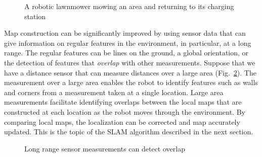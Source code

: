 \begin{figure}
\begin{center}
\end{center}
\caption{A robotic lawnmower mowing an area and returning to its charging station}\label{fig.lawn}
\end{figure}

Map construction can be significantly improved by using sensor data that can give information on regular features in the environment, in particular, at a long range. The regular features can be lines on the ground, a global orientation, or the detection of features that \emph{overlap} with other measurements. Suppose that we have a distance sensor that can measure distances over a large area (Fig.~\ref{fig.map_overlap}). The measurement over a large area enables the robot to identify features such as walls and corners from a measurement taken at a single location. Large area measurements facilitate identifying overlaps between the local maps that are constructed at each location as the robot moves through the environment. By comparing local maps, the localization can be corrected and map accurately updated. This is the topic of the SLAM algorithm described in the next section.

\begin{figure}
\begin{center}
\end{center}
\caption{Long range sensor measurements can detect overlap}\label{fig.map_overlap}
\end{figure}


